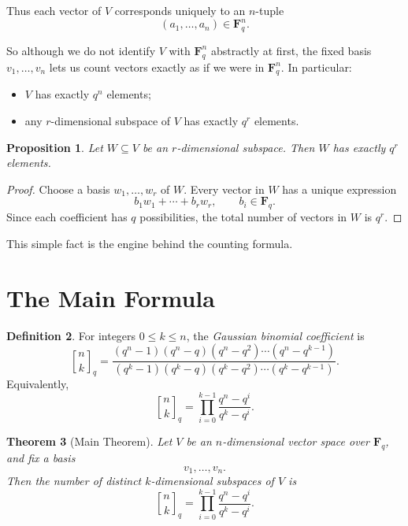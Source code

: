 \documentclass[11pt]{article}
\newtheorem{theorem}{Theorem}[section]
\newtheorem{proposition}[theorem]{Proposition}
\theoremstyle{definition}
\newtheorem{definition}[theorem]{Definition}
\theoremstyle{remark}
\newcommand{\F}{\mathbf{F}}
\newcommand{\qbinom}[2]{\genfrac{[}{]}{0pt}{}{#1}{#2}_q}
\begin{document}
	Thus each vector of \(V\) corresponds uniquely to an \(n\)-tuple
	\[
	(a_1,\dots,a_n)\in \F_q^n.
	\]
	
	So although we do not identify \(V\) with \(\F_q^n\) abstractly at first, the fixed basis \(v_1,\dots,v_n\) lets us count vectors exactly as if we were in \(\F_q^n\). In particular:
	
	\begin{itemize}
		\item \(V\) has exactly \(q^n\) elements;
		\item any \(r\)-dimensional subspace of \(V\) has exactly \(q^r\) elements.
	\end{itemize}
	
	\begin{proposition}
		Let \(W\subseteq V\) be an \(r\)-dimensional subspace. Then \(W\) has exactly \(q^r\) elements.
	\end{proposition}
	
	\begin{proof}
		Choose a basis \(w_1,\dots,w_r\) of \(W\). Every vector in \(W\) has a unique expression
		\[
		b_1w_1+\cdots+b_rw_r,
		\qquad b_i\in \F_q.
		\]
		Since each coefficient has \(q\) possibilities, the total number of vectors in \(W\) is \(q^r\).
	\end{proof}
	
	This simple fact is the engine behind the counting formula.
	
	\section{The Main Formula}
	
	\begin{definition}
		For integers \(0\le k\le n\), the \emph{Gaussian binomial coefficient} is
		\[
		\qbinom{n}{k}
		=
		\frac{(q^n-1)(q^n-q)(q^n-q^2)\cdots(q^n-q^{k-1})}
		{(q^k-1)(q^k-q)(q^k-q^2)\cdots(q^k-q^{k-1})}.
		\]
		Equivalently,
		\[
		\qbinom{n}{k}
		=
		\prod_{i=0}^{k-1}\frac{q^n-q^i}{q^k-q^i}.
		\]
	\end{definition}
	
	\begin{theorem}[Main Theorem]
		Let \(V\) be an \(n\)-dimensional vector space over \(\F_q\), and fix a basis
		\[
		v_1,\dots,v_n.
		\]
		Then the number of distinct \(k\)-dimensional subspaces of \(V\) is
		\[
		\boxed{
			\qbinom{n}{k}
			=
			\prod_{i=0}^{k-1}\frac{q^n-q^i}{q^k-q^i}
		}.
		\]
	\end{theorem}
	
\end{document}
